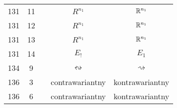 \documentclass[a4paper,11pt]{article}
\begin{document}
\begin{center}
\begin{tabular}{|c|c|c|c|c|}
    131 & 11 & & $R^{ n_{ 1 } }$ & $\mathbb{R}^{ n_{ 1 } }$ \\
    131 & 12 & & $R^{ n_{ 1 } }$ & $\mathbb{R}^{ n_{ 1 } }$ \\
    131 & 13 & & $R^{ n_{ 1 } }$ & $\mathbb{R}^{ n_{ 1 } }$ \\
    131 & 14 & & $E_{ ! }$ & $E_{ 1 }$ \\
    134 & \hphantom{0}9 & & $\leftrightsquigarrow$ & $\rightsquigarrow$ \\
    136 & \hphantom{0}3 & & contrawariantny & kontrawariantny \\
    136 & \hphantom{0}6 & & contrawariantny & kontrawariantny \\
    \hline
  \end{tabular}





  \newpage


\end{center}
\end{document}
